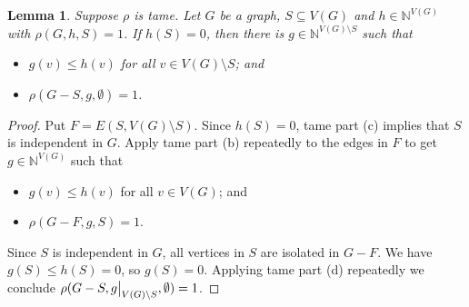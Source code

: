 \documentclass[12pt]{article}
\theoremstyle{plain}
\newtheorem{lem}[thm]{Lemma}
\theoremstyle{definition}
\theoremstyle{remark}
\newcommand{\IN}{\mathbb{N}}
\newcommand\restr[2]{{%
  \left.\kern-\nulldelimiterspace %
  #1 %
  \vphantom{\big|} %
  \right|_{#2} %
  }}
\begin{document}
\begin{lem}\label{CutOff}
	Suppose $\rho$ is tame. Let $G$ be a graph, $S \subseteq V(G)$ and $h \in \IN^{V(G)}$ with $\rho(G, h, S) = 1$.  If $h(S) = 0$, then there is $g \in \IN^{V(G) \setminus S}$ such that
	\begin{itemize}
		\item $g(v) \le h(v)$ for all $v \in V(G) \setminus S$; and
		\item $\rho(G - S, g, \emptyset) = 1$.
	\end{itemize}
\end{lem}
\begin{proof}
	Put $F = E(S, V(G) \setminus S)$. Since $h(S) = 0$, tame part (c) implies that $S$ is independent in $G$. Apply tame part (b) repeatedly to the edges in $F$ to get $g \in \IN^{V(G)}$ such that
	\begin{itemize}
		\item $g(v) \le h(v)$ for all $v \in V(G)$; and
		\item $\rho(G - F, g, S) = 1$.
	\end{itemize}
	 Since $S$ is independent in $G$, all vertices in $S$ are isolated in $G-F$. We have $g(S) \le h(S) = 0$, so $g(S) = 0$. Applying tame part (d) repeatedly we conclude $\rho(G - S, \restr{g}{V(G) \setminus S}, \emptyset) = 1$.
\end{proof}
\end{document}
